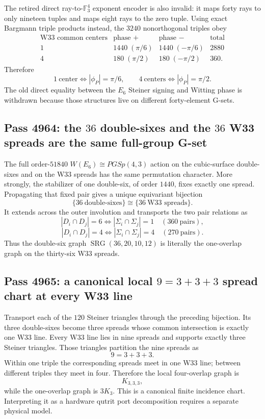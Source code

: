 The retired direct ray-to-$\mathbb F_3^4$ exponent encoder is also invalid: it
maps forty rays to only nineteen tuples and maps eight rays to the zero tuple.
Using exact Bargmann triple products instead, the $3240$ nonorthogonal triples
obey
\[
\begin{array}{c|cc|c}
\text{W33 common centers}&\text{phase }+&\text{phase }-&\text{total}\\\hline
1&1440\;(\pi/6)&1440\;(-\pi/6)&2880\\
4&180\;(\pi/2)&180\;(-\pi/2)&360.
\end{array}
\]
Therefore
\[
\boxed{1\ \text{center}\iff|\phi_P|=\pi/6,
\qquad4\ \text{centers}\iff|\phi_P|=\pi/2.}
\]
The old direct equality between the $E_6$ Steiner signing and Witting phase is
withdrawn because those structures live on different forty-element G-sets.

\subsection{Pass 4964: the $36$ double-sixes and the $36$ W33 spreads are the same full-group G-set}
The full order-$51840$ $W(E_6)\cong PGSp(4,3)$ action on the cubic-surface
double-sixes and on the W33 spreads has the same permutation character.  More
strongly, the stabilizer of one double-six, of order $1440$, fixes exactly one
spread.  Propagating that fixed pair gives a unique equivariant bijection
\[
\boxed{\{36\ \text{double-sixes}\}\cong\{36\ \text{W33 spreads}\}}.
\]
It extends across the outer involution and transports the two pair relations as
\[
|D_i\cap D_j|=6\iff|\Sigma_i\cap\Sigma_j|=1
\quad(360\ \text{pairs}),
\]
\[
|D_i\cap D_j|=4\iff|\Sigma_i\cap\Sigma_j|=4
\quad(270\ \text{pairs}).
\]
Thus the double-six graph $\operatorname{SRG}(36,20,10,12)$ is literally the
one-overlap graph on the thirty-six W33 spreads.

\subsection{Pass 4965: a canonical local $9=3+3+3$ spread chart at every W33 line}
Transport each of the $120$ Steiner triangles through the preceding bijection.
Its three double-sixes become three spreads whose common intersection is
exactly one W33 line.  Every W33 line lies in nine spreads and supports exactly
three Steiner triangles.  Those triangles partition the nine spreads as
\[
\boxed{9=3+3+3}.
\]
Within one triple the corresponding spreads meet in one W33 line; between
different triples they meet in four.  Therefore the local four-overlap graph is
\[
\boxed{K_{3,3,3}},
\]
while the one-overlap graph is $3K_3$.  This is a canonical finite incidence
chart.  Interpreting it as a hardware qutrit port decomposition requires a
separate physical model.

